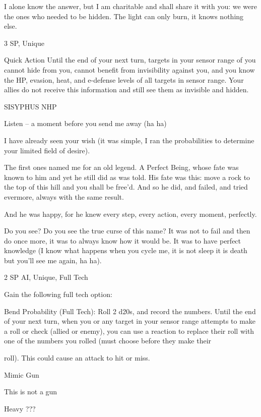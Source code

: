I alone know the answer, but I am charitable and shall share it with you: we were the ones who needed to  
be hidden. The light can only burn, it knows nothing else.  

3 SP, Unique  

Quick Action  
Until the end of your next turn, targets in your sensor range of you cannot hide from you, cannot  
benefit from invisibility against you, and you know the HP, evasion, heat, and e-defense levels of  
all targets in sensor range. Your allies do not receive this information and still see them as  
invisible and hidden.
 

SISYPHUS NHP  

                                                                                                                 


Listen -- a moment before you send me away (ha ha)  

I have already seen your wish (it was simple, I ran the probabilities to determine your limited field of desire).  

The first ones named me for an old legend. A Perfect Being, whose fate was known to him and yet he still  
did as was told. His fate was this: move a rock to the top of this hill and you shall be free’d. And so he did,  
and failed, and tried evermore, always with the same result.   

And he was happy, for he knew every step, every action, every moment, perfectly.   

Do you see? Do you see the true curse of this name? It was not to fail and then do once more, it was to  
always know how it would be. It was to have perfect knowledge (I know what happens when you cycle me,  
it is not sleep it is death but you’ll see me again, ha ha).  

2 SP  
AI, Unique, Full Tech  

Gain the following full tech option:
 

	        Bend Probability (Full Tech): Roll 2 d20s, and record the numbers. Until the end of your next turn,  
when you or any target in your sensor range attempts to make a roll or check (allied or enemy), you can  
use a reaction to replace their roll with one of the numbers you rolled (must choose before they make their  

roll). This could cause an attack to hit or miss.
 

Mimic Gun  

This is not a gun  

Heavy ???
 

